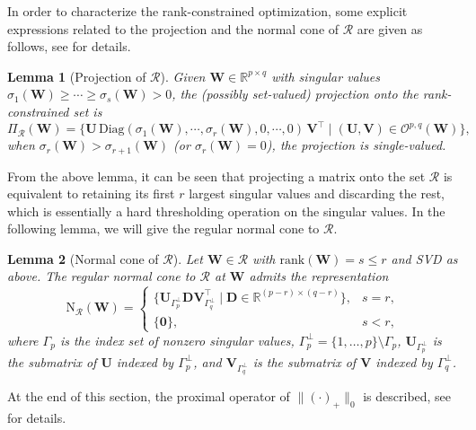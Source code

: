 \documentclass[sn-mathphys]{JORSC-jnl}%
\theoremstyle{thmstyleone}%
\theoremstyle{thmstylethree}%
\newtheorem{lemma}{Lemma}
\theoremstyle{thmstyleone} %
\begin{document}
In order to characterize the rank-constrained optimization, some explicit expressions related to the projection and the normal cone of $\mathcal{R}$ are given as follows, see \cite{li2023normal} for details.


\begin{lemma}[Projection of $\mathcal{R}$]
Given $\mathbf{W}\in\mathbb{R}^{p\times q}$ with singular values $\sigma_1(\mathbf{W})\ge\cdots\ge\sigma_s(\mathbf{W})>0$,
the (possibly set-valued) projection onto the rank-constrained set is
\begin{equation*}
\Pi_{\mathcal{R}}(\mathbf{W})
=
\{
\mathbf{U}\,\mathrm{Diag}(\sigma_1(\mathbf{W}),\cdots,\sigma_r(\mathbf{W}),0,\cdots,0)\,\mathbf{V}^\top \mid  (\mathbf{U},\mathbf{V})\in\mathcal{O}^{p,q}(\mathbf{W})
\},
\end{equation*}
when $\sigma_r(\mathbf{W})>\sigma_{r+1}(\mathbf{W})$ (or $\sigma_r(\mathbf{W})=0$), the projection is single-valued. 
\end{lemma}


From the above lemma,  it can be seen that projecting a matrix onto the set $\mathcal{R}$ is equivalent to retaining its first $r$ largest singular values and discarding the rest, which is essentially a hard thresholding operation on the singular values.
In the following lemma, we will give the regular normal cone to $\mathcal{R}$.

\begin{lemma}[Normal cone of $\mathcal{R}$] \label{def3}
Let $\mathbf{W}\in\mathcal{R}$ with $\mathrm{rank}(\mathbf{W})=s\le r$ and SVD as above. The regular normal cone to $\mathcal{R}$
at $\mathbf{W}$ admits the representation
\begin{equation*}
\mathrm{N}_{\mathcal{R}}(\mathbf{W})
=
\begin{cases}
\displaystyle
\bigl\{
\mathbf{U}_{\Gamma_p^\perp} \mathbf{D} \mathbf{V}_{\Gamma_q^\perp}^\top \mid
\mathbf{D}\in\mathbb{R}^{(p-r)\times(q-r)}
\bigr\},
& s = r,
\\[4pt]
\{ \mathbf{0} \},
& s < r,
\end{cases}
\end{equation*}
where $\Gamma_p$ is the index set of nonzero singular values, $\Gamma_p^\perp=\{1,\ldots,p\}\setminus\Gamma_p$, $\mathbf{U}_{\Gamma_p^\perp}$  is the submatrix of $\mathbf{U}$ indexed by $\Gamma_p^\perp$, and $\mathbf{V}_{\Gamma_q^\perp}$  is the submatrix of $\mathbf{V}$ indexed by $\Gamma_q^\perp$.
\end{lemma}

At the end of this section, the proximal operator of $\|(\cdot)_+\|_0$ is described, see \cite{wang2021support2} for details.
\end{document}
